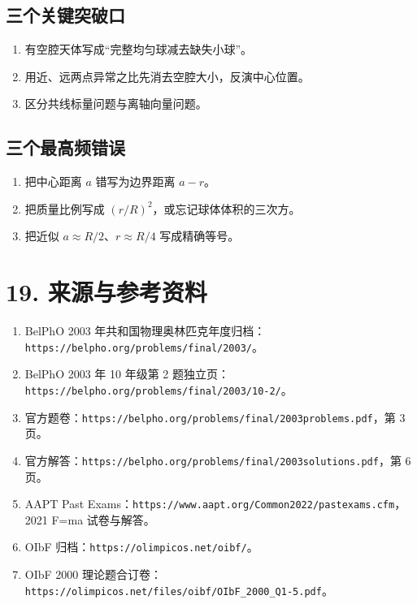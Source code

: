 \documentclass[
  11pt,
  UTF8]{ctexart}
\providecommand{\tightlist}{%
  \setlength{\itemsep}{0pt}\setlength{\parskip}{0pt}}
\begin{document}
\hypertarget{ux4e09ux4e2aux5173ux952eux7a81ux7834ux53e3}{%
\subsection{三个关键突破口}\label{ux4e09ux4e2aux5173ux952eux7a81ux7834ux53e3}}

\begin{enumerate}
\def\labelenumi{\arabic{enumi}.}
\tightlist
\item
  有空腔天体写成``完整均匀球减去缺失小球''。
\item
  用近、远两点异常之比先消去空腔大小，反演中心位置。
\item
  区分共线标量问题与离轴向量问题。
\end{enumerate}

\hypertarget{ux4e09ux4e2aux6700ux9ad8ux9891ux9519ux8bef}{%
\subsection{三个最高频错误}\label{ux4e09ux4e2aux6700ux9ad8ux9891ux9519ux8bef}}

\begin{enumerate}
\def\labelenumi{\arabic{enumi}.}
\tightlist
\item
  把中心距离 \(a\) 错写为边界距离 \(a-r\)。
\item
  把质量比例写成 \((r/R)^2\)，或忘记球体体积的三次方。
\item
  把近似 \(a≈R/2\)、\(r≈R/4\) 写成精确等号。
\end{enumerate}

\hypertarget{ux6765ux6e90ux4e0eux53c2ux8003ux8d44ux6599}{%
\section{19.
来源与参考资料}\label{ux6765ux6e90ux4e0eux53c2ux8003ux8d44ux6599}}

\begin{enumerate}
\def\labelenumi{\arabic{enumi}.}
\tightlist
\item
  BelPhO 2003
  年共和国物理奥林匹克年度归档：\texttt{https://belpho.org/problems/final/2003/}。
\item
  BelPhO 2003 年 10 年级第 2
  题独立页：\texttt{https://belpho.org/problems/final/2003/10-2/}。
\item
  官方题卷：\texttt{https://belpho.org/problems/final/2003problems.pdf}，第
  3 页。
\item
  官方解答：\texttt{https://belpho.org/problems/final/2003solutions.pdf}，第
  6 页。
\item
  AAPT Past
  Exams：\texttt{https://www.aapt.org/Common2022/pastexams.cfm}，2021
  F=ma 试卷与解答。
\item
  OIbF 归档：\texttt{https://olimpicos.net/oibf/}。
\item
  OIbF 2000
  理论题合订卷：\texttt{https://olimpicos.net/files/oibf/OIbF\_2000\_Q1-5.pdf}。
\end{enumerate}
\end{document}
